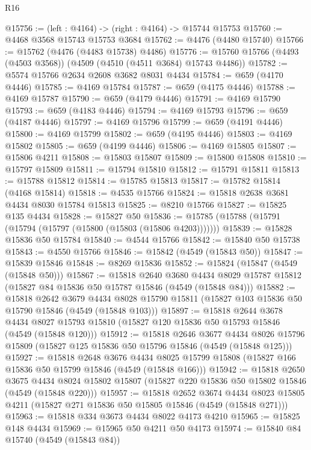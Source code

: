 \begin{lexlean}{R16}
\begin{coremodule}
@15756 := (left : @4164) -> (right : @4164) -> @15744 @15753
@15760 := @4468 @3568 @15743 @15753 @3684
@15762 := @4476 (@4480 @15740)
@15766 := @15762 (@4476 (@4483 @15738) @4486)
@15776 := @15760 @15766 (@4493 (@4503 @3568)) (@4509 (@4510 (@4511 @3684) @15743 @4486))
@15782 := @5574 @15766 @2634 @2608 @3682 @8031 @4434
@15784 := @659 (@4170 @4446)
@15785 := @4169 @15784
@15787 := @659 (@4175 @4446)
@15788 := @4169 @15787
@15790 := @659 (@4179 @4446)
@15791 := @4169 @15790
@15793 := @659 (@4183 @4446)
@15794 := @4169 @15793
@15796 := @659 (@4187 @4446)
@15797 := @4169 @15796
@15799 := @659 (@4191 @4446)
@15800 := @4169 @15799
@15802 := @659 (@4195 @4446)
@15803 := @4169 @15802
@15805 := @659 (@4199 @4446)
@15806 := @4169 @15805
@15807 := @15806 @4211
@15808 := @15803 @15807
@15809 := @15800 @15808
@15810 := @15797 @15809
@15811 := @15794 @15810
@15812 := @15791 @15811
@15813 := @15788 @15812
@15814 := @15785 @15813
@15817 := @15782 @15814 (@4168 @15814)
@15818 := @4535 @15766
@15824 := @15818 @2638 @3681 @4434 @8030 @15784 @15813
@15825 := @8210 @15766
@15827 := @15825 @135 @4434
@15828 := @15827 @50
@15836 := @15785 (@15788 (@15791 (@15794 (@15797 (@15800 (@15803 (@15806 @4203)))))))
@15839 := @15828 @15836 @50 @15784
@15840 := @4544 @15766
@15842 := @15840 @50 @15738
@15843 := @4550 @15766
@15846 := @15842 (@4549 (@15843 @50))
@15847 := @15839 @15846
@15848 := @8269 @15836
@15852 := @15824 (@15847 (@4549 (@15848 @50)))
@15867 := @15818
    @2640
    @3680
    @4434
    @8029
    @15787
    @15812
    (@15827 @84 @15836 @50 @15787 @15846 (@4549 (@15848 @84)))
@15882 := @15818
    @2642
    @3679
    @4434
    @8028
    @15790
    @15811
    (@15827 @103 @15836 @50 @15790 @15846 (@4549 (@15848 @103)))
@15897 := @15818
    @2644
    @3678
    @4434
    @8027
    @15793
    @15810
    (@15827 @120 @15836 @50 @15793 @15846 (@4549 (@15848 @120)))
@15912 := @15818
    @2646
    @3677
    @4434
    @8026
    @15796
    @15809
    (@15827 @125 @15836 @50 @15796 @15846 (@4549 (@15848 @125)))
@15927 := @15818
    @2648
    @3676
    @4434
    @8025
    @15799
    @15808
    (@15827 @166 @15836 @50 @15799 @15846 (@4549 (@15848 @166)))
@15942 := @15818
    @2650
    @3675
    @4434
    @8024
    @15802
    @15807
    (@15827 @220 @15836 @50 @15802 @15846 (@4549 (@15848 @220)))
@15957 := @15818
    @2652
    @3674
    @4434
    @8023
    @15805
    @4211
    (@15827 @271 @15836 @50 @15805 @15846 (@4549 (@15848 @271)))
@15963 := @15818 @334 @3673 @4434 @8022 @4173 @4210
@15965 := @15825 @148 @4434
@15969 := @15965 @50 @4211 @50 @4173
@15974 := @15840 @84 @15740 (@4549 (@15843 @84))

\end{coremodule}
\end{lexlean}
